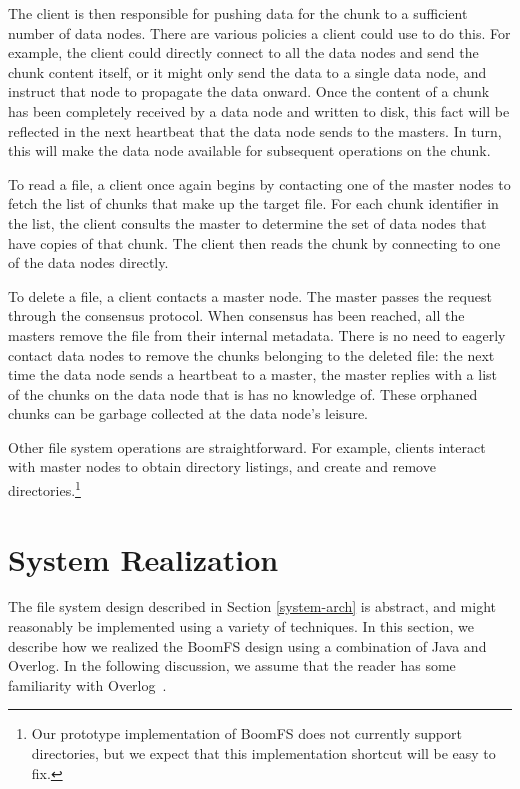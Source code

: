\documentclass[twocolumn]{article}
\begin{document}
The client is then responsible for pushing data for the chunk to a
sufficient number of data nodes. There are various policies a client
could use to do this. For example, the client could directly connect
to all the data nodes and send the chunk content itself, or it might
only send the data to a single data node, and instruct that node to
propagate the data onward. Once the content of a chunk has been
completely received by a data node and written to disk, this fact will
be reflected in the next heartbeat that the data node sends to the
masters. In turn, this will make the data node available for
subsequent operations on the chunk.

To read a file, a client once again begins by contacting one of the
master nodes to fetch the list of chunks that make up the target
file. For each chunk identifier in the list, the client consults the
master to determine the set of data nodes that have copies of that
chunk. The client then reads the chunk by connecting to one of the
data nodes directly.

To delete a file, a client contacts a master node. The master passes
the request through the consensus protocol. When consensus has been
reached, all the masters remove the file from their internal
metadata. There is no need to eagerly contact data nodes to remove the
chunks belonging to the deleted file: the next time the data node
sends a heartbeat to a master, the master replies with a list of the
chunks on the data node that is has no knowledge of. These orphaned
chunks can be garbage collected at the data node's leisure.

Other file system operations are straightforward. For example, clients
interact with master nodes to obtain directory listings, and create
and remove directories.\footnote{Our prototype implementation of
  BoomFS does not currently support directories, but we expect that
  this implementation shortcut will be easy to fix.}

\section{System Realization}
\label{system-realize}
The file system design described in Section \ref{system-arch} is
abstract, and might reasonably be implemented using a variety of
techniques. In this section, we describe how we realized the BoomFS
design using a combination of Java and Overlog. In the following
discussion, we assume that the reader has some familiarity with
Overlog~\cite{dn-sigmod}.
\end{document}
